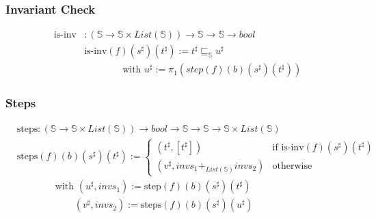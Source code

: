 \documentclass{beamer}
\begin{document}
\begin{frame}
    \frametitle{Invariant Check}
    \begin{align*}
        \text{is-inv} &: (\mathbb{S} \to \mathbb{S} \times List(\mathbb{S}))  \to \mathbb{S} \to \mathbb{S} \to bool \\
        & \text{is-inv} (f) (s^{\sharp}) (t^{\sharp}) := t^{\sharp} \sqsubseteq_\mathbb{S} u^{\sharp} \\
        & \qquad \qquad \text{with } u^{\sharp} := \pi_1 (step (f) (b) (s^{\sharp}) (t^{\sharp}))
    \end{align*}
\end{frame}





        \begin{frame}
            \frametitle{Steps}
            \begin{align*}
                &\text{steps} : (\mathbb{S} \to \mathbb{S} \times List(\mathbb{S})) \to bool \to \mathbb{S} \to \mathbb{S} \to \mathbb{S} \times List(\mathbb{S}) \\
                &\text{steps} (f) (b) (s^{\sharp}) (t^{\sharp}) := \begin{cases}
                                                                (t^{\sharp}, [t^{\sharp}]) & \text{if } \text{is-inv} (f) (s^{\sharp}) (t^{\sharp}) \\
                                                                (v^{\sharp}, invs_1 +_{List(\mathbb{S})} invs_2) & \text{otherwise}
                                                            \end{cases} \\
            & \qquad \qquad \text{with } (u^{\sharp}, invs_1) := \text{step} (f) (b) (s^{\sharp}) (t^{\sharp}) \\
            & \qquad \qquad \qquad (v^{\sharp}, invs_2) := \text{steps} (f) (b) (s^{\sharp}) (u^{\sharp})
            \end{align*}
        \end{frame}
\end{document}
